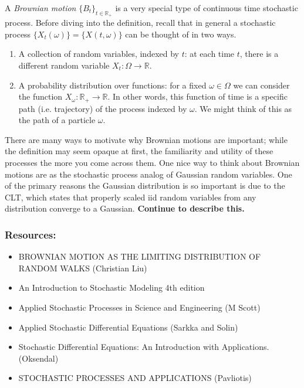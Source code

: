 \documentclass[12pt]{article}
\newcommand{\R}{\mathbb{R}}
\begin{document}
A \textit{Brownian motion} $\{B_t\}_{t \in \R_+}$ is a very special type of continuous time stochastic process. Before diving into the definition, recall that in general a stochastic process 
$\{X_t(\omega)\} = \{X(t, \omega)\}$ can be thought of in two ways. 
\begin{enumerate}
\item A collection of random variables, indexed by $t$: at each time $t$, there is a different random variable $X_t: \Omega \to \R$. 
\item A probability distribution over functions: for a fixed $\omega \in \Omega$ we can consider the function $X_\omega: \R_+ \to \R$. In other words, this function of time is 
a specific path (i.e. trajectory) of the process indexed by $\omega$. We might think of this as the path of a particle $\omega$. 
\end{enumerate}

There are many ways to motivate why Brownian motions are important; while the definition may seem opaque at first, the familiarity and utility of these processes the more you come across them. 
One nice way to think about Brownian motions are as the stochastic process analog of Gaussian random variables. One of the primary reasons the Gaussian distribution is so important is due to 
the CLT, which states that properly scaled iid random variables from any distribution converge to a Gaussian. \textbf{Continue to describe this.}




\subsubsection{Resources:}
\begin{itemize}
\item BROWNIAN MOTION AS THE LIMITING DISTRIBUTION OF RANDOM WALKS (Christian Liu)
\item An Introduction to Stochastic Modeling 4th edition 
\item Applied Stochastic Processes in Science and Engineering (M Scott)
\item Applied Stochastic Differential Equations (Sarkka and Solin)
\item Stochastic Differential Equations: An Introduction with Applications. (Oksendal)
\item STOCHASTIC PROCESSES AND APPLICATIONS (Pavliotis)
\end{itemize}


\end{document}
